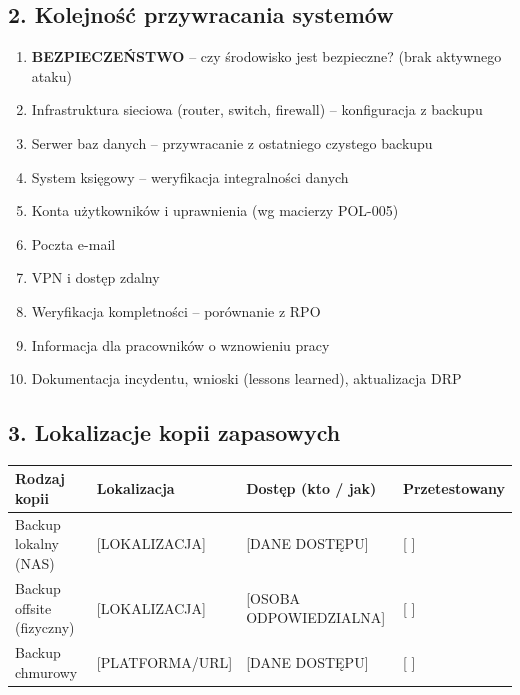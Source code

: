 \documentclass[12pt,a4paper]{article}
\providecommand{\tightlist}{\setlength{\itemsep}{0pt}\setlength{\parskip}{0pt}}
\begin{document}
\subsection{2. Kolejność przywracania
systemów}\label{kolejnoux15bux107-przywracania-systemuxf3w}

\begin{enumerate}
\tightlist
\item
  \textbf{BEZPIECZEŃSTWO} -- czy środowisko jest bezpieczne? (brak
  aktywnego ataku)
\item
  Infrastruktura sieciowa (router, switch, firewall) -- konfiguracja z
  backupu
\item
  Serwer baz danych -- przywracanie z ostatniego czystego backupu
\item
  System księgowy -- weryfikacja integralności danych
\item
  Konta użytkowników i uprawnienia (wg macierzy POL-005)
\item
  Poczta e-mail
\item
  VPN i dostęp zdalny
\item
  Weryfikacja kompletności -- porównanie z RPO
\item
  Informacja dla pracowników o wznowieniu pracy
\item
  Dokumentacja incydentu, wnioski (lessons learned), aktualizacja DRP
\end{enumerate}

\subsection{3. Lokalizacje kopii
zapasowych}\label{lokalizacje-kopii-zapasowych}

\begin{longtable}[]{@{}>{\raggedright\arraybackslash}p{}>{\raggedright\arraybackslash}p{}>{\raggedright\arraybackslash}p{}>{\raggedright\arraybackslash}p{}@{}}
\toprule\noalign{}
Rodzaj kopii & Lokalizacja & Dostęp (kto / jak) & Przetestowany \\
\midrule\noalign{}
\endhead
\bottomrule\noalign{}
\endlastfoot
Backup lokalny (NAS) & {[}LOKALIZACJA{]} & {[}DANE DOSTĘPU{]} & {[} {]}
\underline{\hspace{2cm}} \\
Backup offsite (fizyczny) & {[}LOKALIZACJA{]} & {[}OSOBA
ODPOWIEDZIALNA{]} & {[} {]} \underline{\hspace{2cm}} \\
Backup chmurowy & {[}PLATFORMA/URL{]} & {[}DANE DOSTĘPU{]} & {[} {]}
\underline{\hspace{2cm}} \\
\end{longtable}
\end{document}
